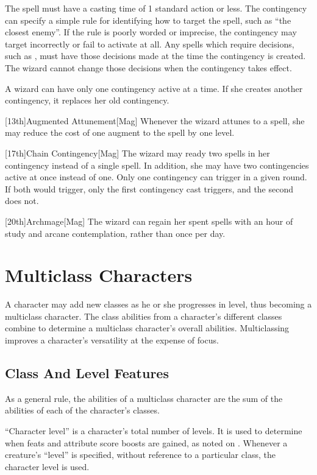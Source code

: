         The spell must have a casting time of 1 standard action or less.
        The contingency can specify a simple rule for identifying how to target the spell, such as ``the closest enemy''.
        If the rule is poorly worded or imprecise, the contingency may target incorrectly or fail to activate at all.
        Any spells which require decisions, such as , must have those decisions made at the time the contingency is created.
        The wizard cannot change those decisions when the contingency takes effect.

        A wizard can have only one contingency active at a time.
        If she creates another contingency, it replaces her old contingency.

        [13th]{Augmented Attunement}[Mag]
        Whenever the wizard attunes to a spell, she may reduce the cost of one augment to the spell by one level.

        [17th]{Chain Contingency}[Mag]
        The wizard may ready two spells in her contingency instead of a single spell.
        In addition, she may have two contingencies active at once instead of one.
        Only one contingency can trigger in a given round.
        If both would trigger, only the first contingency cast triggers, and the second does not.

        [20th]{Archmage}[Mag]
        The wizard can regain her spent spells with an hour of study and arcane contemplation, rather than once per day.

\section{Multiclass Characters}\label{Multiclass Characters}
    A character may add new classes as he or she progresses in level, thus becoming a multiclass character.
    The class abilities from a character's different classes combine to determine a multiclass character's overall abilities.
    Multiclassing improves a character's versatility at the expense of focus.

    \subsection{Class And Level Features}
        As a general rule, the abilities of a multiclass character are the sum
        of the abilities of each of the character's classes.

        ``Character level'' is a character's total number of levels.
        It is used to determine when feats and attribute score boosts are gained, as noted on .
        Whenever a creature's ``level'' is specified, without reference to a particular class, the character level is used.

